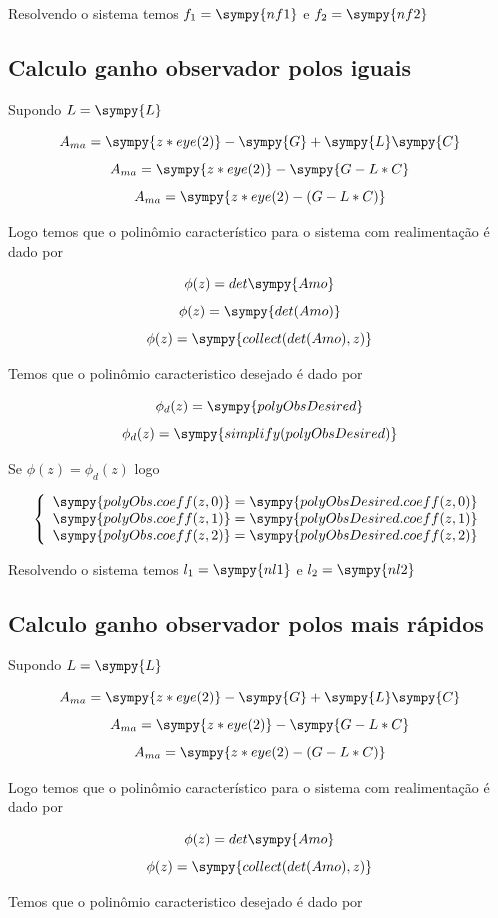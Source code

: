 \documentclass[a4paper,11pt]{article}
\begin{document}
Resolvendo o sistema temos $f_1 = \sympy{nf1} $ e $f_2 = \sympy{nf2}$

\subsection{Calculo ganho observador polos iguais}

Supondo $L = \sympy{L}$

$$A_{ma} = \sympy{z*eye(2)} - \sympy{G} + \sympy{L}\sympy{C}$$
$$A_{ma} = \sympy{z*eye(2)} - \sympy{G -L*C}$$
$$A_{ma} = \sympy{z*eye(2) - (G -L*C)}$$

Logo temos que o polinômio característico para o sistema com realimentação é dado por 

$$\phi(z) = det\sympy{Amo}$$
$$\phi(z) = \sympy{det(Amo)}$$
$$\phi(z) = \sympy{collect(det(Amo),z)}$$

Temos que o polinômio caracteristico desejado é dado por

$$\phi_d(z) = \sympy{polyObsDesired}$$
$$\phi_d(z) = \sympy{simplify(polyObsDesired)}$$

Se $\phi(z) = \phi_d(z)$ logo

$$
\left\{
    \begin{array}{l}
        \sympy{polyObs.coeff(z,0)} = \sympy{polyObsDesired.coeff(z,0)}\\
        \sympy{polyObs.coeff(z,1)} = \sympy{polyObsDesired.coeff(z,1)}\\
        \sympy{polyObs.coeff(z,2)} = \sympy{polyObsDesired.coeff(z,2)}\\
    \end{array}
\right.
$$

Resolvendo o sistema temos $l_1 = \sympy{nl1} $ e $l_2 = \sympy{nl2}$

\subsection{Calculo ganho observador polos mais rápidos}

Supondo $L = \sympy{L}$

$$A_{ma} = \sympy{z*eye(2)} - \sympy{G} + \sympy{L}\sympy{C}$$
$$A_{ma} = \sympy{z*eye(2)} - \sympy{G -L*C}$$
$$A_{ma} = \sympy{z*eye(2) - (G -L*C)}$$

Logo temos que o polinômio característico para o sistema com realimentação é dado por 

$$\phi(z) = det\sympy{Amo}$$
$$\phi(z) = \sympy{collect(det(Amo),z)}$$

Temos que o polinômio caracteristico desejado é dado por
\end{document}
